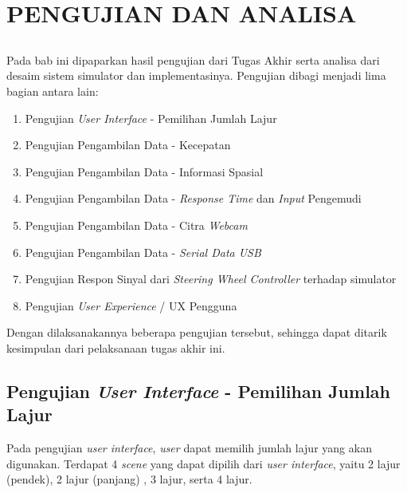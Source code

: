 \chapter{PENGUJIAN DAN ANALISA}
\vspace{1ex}

\section*{}
Pada bab ini dipaparkan hasil pengujian dari Tugas Akhir serta analisa dari desaim sistem simulator dan implementasinya. Pengujian dibagi menjadi lima bagian antara lain:
\vspace{1ex}
\begin{enumerate}[nolistsep]
	\item Pengujian \textit{User Interface} - Pemilihan Jumlah Lajur
	\item Pengujian Pengambilan Data - Kecepatan
	\item Pengujian Pengambilan Data - Informasi Spasial
	\item Pengujian Pengambilan Data - \textit{Response Time} dan \textit{Input} Pengemudi
	\item Pengujian Pengambilan Data - Citra \textit{Webcam}
	\item Pengujian Pengambilan Data - \textit{Serial Data USB}
	\item Pengujian Respon Sinyal dari \textit{Steering Wheel Controller} terhadap simulator
	\item Pengujian \textit{User Experience} / UX Pengguna
	
	\vspace{1ex}

\end{enumerate}
Dengan dilaksanakannya beberapa pengujian tersebut, sehingga dapat ditarik kesimpulan dari pelaksanaan tugas akhir ini.
\vspace{1ex}

\section{Pengujian \textit{User Interface} - Pemilihan Jumlah Lajur}
\vspace{1ex}

Pada pengujian \textit{user interface}, \textit{user} dapat memilih jumlah lajur yang akan digunakan. Terdapat 4 \textit{scene} yang dapat dipilih dari \textit{user interface}, yaitu 2 lajur (pendek), 2 lajur (panjang) , 3 lajur, serta 4 lajur.

